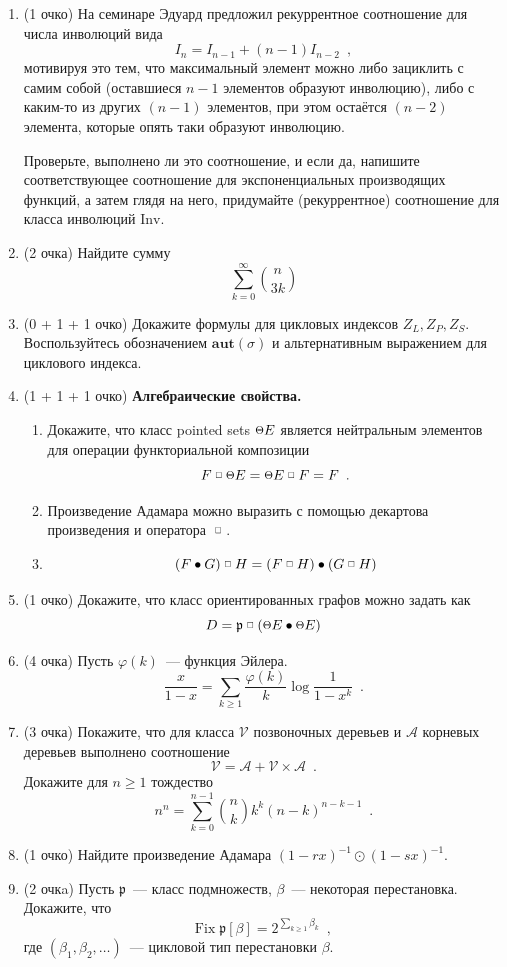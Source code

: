 \documentclass{article}
\def \fprod {\; \raisebox{.3\height}{\scalebox{0.6}{$\square$}}\; }
\def \point {\raisebox{.1\height}{\scalebox{0.8}{$\Theta$}}}
\theoremstyle{definition}
\begin{document}
\begin{enumerate}
	\item(1 очко) На семинаре Эдуард предложил рекуррентное 
	соотношение для числа инволюций вида
	\[
		I_{n} = I_{n-1} + (n-1)I_{n-2} \enspace ,
	\]
	мотивируя это тем, 
	что 
	максимальный элемент можно либо зациклить с самим собой (оставшиеся \( n-1 
	\) 
	элементов образуют инволюцию), либо с каким-то из других \( (n-1) \) 
	элементов, 
	при этом остаётся \( (n-2) \) элемента, которые опять таки образуют 
	инволюцию.
	
	Проверьте, выполнено ли это соотношение, и если да, напишите 
	соответствующее 
	соотношение для экспоненциальных производящих функций, а затем глядя на 
	него, 
	придумайте (рекуррентное) соотношение для класса инволюций \( \mathrm{Inv} 
	\).
    \item(2 очка) Найдите сумму 
    \[
        \sum_{k = 0}^{\infty} {n \choose 3k}
    \]

	\item(0 + 1 + 1 очко) Докажите формулы для цикловых индексов \( Z_L, Z_P,
Z_S \). Воспользуйтесь обозначением \( \mathbf{aut}(\sigma) \) и альтернативным
выражением для циклового индекса.
	\item(1 + 1 + 1 очко) \textbf{Алгебраические свойства.}
        \begin{enumerate}
        \item	Докажите, что класс pointed sets \( \point E \) является 
        нейтральным элементов для операции функториальной композиции
        \[
            F \fprod \point E = \point E \fprod F = F \enspace .
        \]
        \item Произведение Адамара можно выразить с помощью декартова произведения 
        и оператора \( \fprod \).
        \item 
\[
	(F \bullet G) \fprod H = (F \fprod H) \bullet (G \fprod H)
\]
        \end{enumerate}
	\item(1 очко) Докажите, что класс ориентированных графов можно задать как 
	\[
		D = \mathfrak p \fprod (\point E \bullet \point E)
	\]
    \item(4 очка) Пусть \( \varphi(k) \)~--- функция Эйлера.
\[
    \dfrac{x}{1-x} = \sum_{k \geq 1} \dfrac{\varphi(k)}{k} \log \dfrac{1}{1 -
x^k} \enspace.
\]
	\item(3 очка) Покажите, что для класса \( \mathcal V \) позвоночных деревьев
и \( \mathcal A \) корневых деревьев выполнено соотношение
\[
    \mathcal V = \mathcal A + \mathcal V \times \mathcal A \enspace .
\]
Докажите для \( n \geq 1 \) тождество 
\[
    n^n = \sum_{k = 0}^{n-1} {n \choose k} k^k (n-k)^{n-k-1} \enspace .
\]
    \item(1 очко) Найдите произведение Адамара \( (1 - rx)^{-1} \odot (1 - sx)^{-1}\).
    \item(2 очкa) Пусть \( \mathfrak p \)~--- класс подмножеств, \( \beta\)~---
некоторая перестановка. Докажите, что
    \[
    \mathrm{Fix}\; \mathfrak p [\beta] = 2^{\sum_{k \geq 1} \beta_k} \enspace ,
    \]
где $(\beta_1, \beta_2, \ldots)$~--- цикловой тип перестановки \( \beta \).
\end{enumerate}

\footnotesize


    
\end{document}
